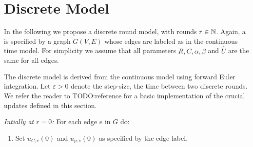 
\section{Discrete Model}\label{sec:discrete}

In the following we propose a discrete round model, with rounds $r \in \mathbb{N}$.
Again, a \Pn is specified by a graph $G(V,E)$ whose edges are labeled as in the continuous time model.
For simplicity we assume that all parameters $R,C,\alpha,\beta$ and $\hat{U}$ are the same for all edges.

The discrete model is derived from the continuous model using forward Euler integration. Let $\varepsilon > 0$ denote the step-size, \ie the time between two discrete rounds. We refer the reader to TODO:reference for a basic implementation of the crucial updates defined in this section.

\medskip

\noindent
{\em Intially at $r=0$:}
For each edge $e$ in $G$ do:  
\begin{enumerate}
\item Set $u_{C,e}(0)$ and $u_{p,e}(0)$ as specified by the edge label.
\end{enumerate}

\medskip

